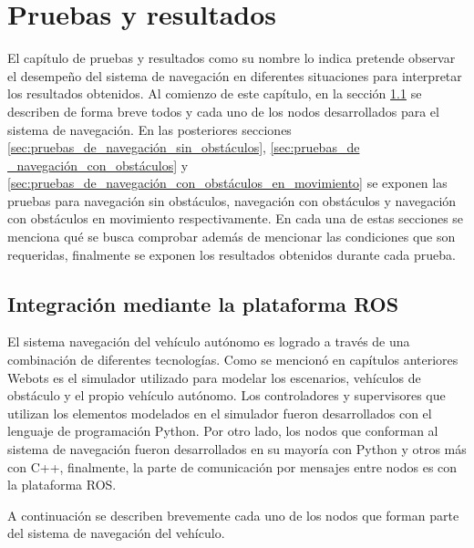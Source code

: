 \chapter{Pruebas y resultados} \label{cap:pruebas_y_resultados}
El capítulo de pruebas y resultados como su nombre lo indica pretende observar el desempeño del sistema de navegación en diferentes situaciones para interpretar los resultados obtenidos. Al comienzo de este capítulo, en la sección \ref{sec:integración_mediante_la_plataforma_ROS} se describen de forma breve todos y cada uno de los nodos desarrollados para el sistema de navegación. En las posteriores secciones \ref{sec:pruebas_de_navegación_sin_obstáculos}, \ref{sec:pruebas_de _navegación_con_obstáculos} y \ref{sec:pruebas_de_navegación_con_obstáculos_en_movimiento} se exponen las pruebas para navegación sin obstáculos, navegación con obstáculos y navegación con obstáculos en movimiento respectivamente. En cada una de estas secciones se menciona qué se busca comprobar además de mencionar las condiciones que son requeridas, finalmente se exponen los resultados obtenidos durante cada prueba.

\section{Integración mediante la plataforma ROS} \label{sec:integración_mediante_la_plataforma_ROS}

El sistema navegación del vehículo autónomo es logrado a través de una combinación de diferentes tecnologías. Como se mencionó en capítulos anteriores Webots es el simulador utilizado para modelar los escenarios, vehículos de obstáculo y el propio vehículo autónomo. Los controladores y supervisores que utilizan los elementos modelados en el simulador fueron desarrollados con el lenguaje de programación Python. Por otro lado, los nodos que conforman al sistema de navegación fueron desarrollados en su mayoría con Python y otros más con C++, finalmente, la parte de comunicación por mensajes entre nodos es con la plataforma ROS.

A continuación se describen brevemente cada uno de los nodos que forman parte del sistema de navegación del vehículo.

\hfill

